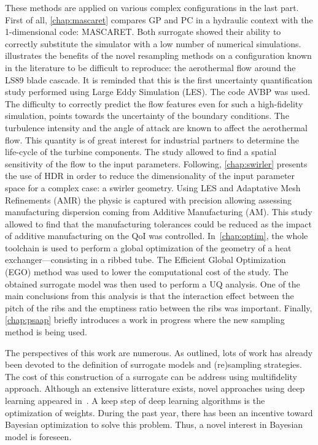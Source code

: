 These methods are applied on various complex configurations in the last part. First of all, \cref{chap:mascaret} compares GP and PC in a hydraulic context with the 1-dimensional code: MASCARET. Both surrogate showed their ability to correctly substitute the simulator with a low number of numerical simulations.  illustrates the benefits of the novel resampling methods on a configuration known in the literature to be difficult to reproduce: the aerothermal flow around the LS89 blade cascade. It is reminded that this is the first uncertainty quantification study performed using Large Eddy Simulation (LES). The code AVBP was used. The difficulty to correctly predict the flow features even for such a high-fidelity simulation, points towards the uncertainty of the boundary conditions. The turbulence intensity and the angle of attack are known to affect the aerothermal flow. This quantity is of great interest for industrial partners to determine the life-cycle of the turbine components. The study allowed to find a spatial sensitivity of the flow to the input parameters. Following, \cref{chap:swirler} presents the use of HDR in order to reduce the dimensionality of the input parameter space for a complex case: a swirler geometry. Using LES and Adaptative Mesh Refinements (AMR) the physic is captured with precision allowing assessing manufacturing dispersion coming from Additive Manufacturing (AM). This study allowed to find that the manufacturing tolerances could be reduced as the impact of additive manufacturing on the QoI was controlled. In~\cref{chap:optim}, the whole toolchain is used to perform a global optimization of the geometry of a heat exchanger---consisting in a ribbed tube. The Efficient Global Optimization (EGO) method was used to lower the computational cost of the study. The obtained surrogate model was then used to perform a UQ analysis. One of the main conclusions from this analysis is that the interaction effect between the pitch of the ribs and the emptiness ratio between the ribs was important. Finally, \cref{chap:psaap} briefly introduces a work in progress where the new sampling method is being used.


The perspectives of this work are numerous. As outlined, lots of work has already been devoted to the definition of surrogate models and (re)sampling strategies. The cost of this construction of a surrogate can be address using multifidelity approach. Although an extensive litterature exists, novel approaches using deep learning appeared in~\cite{raissi2016}. A keep step of deep learning algorithms is the optimization of weights. During the past year, there has been an incentive toward Bayesian optimization to solve this problem. Thus, a novel interest in Bayesian model is foreseen.

